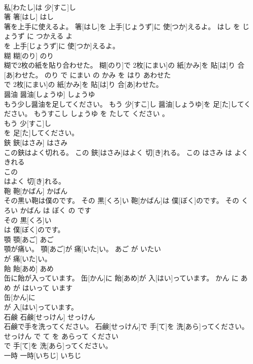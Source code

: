 \documentclass[8pt]{extreport}
\begin{document}
\begin{CJK}{UTF8}{min}
\\	私[わたし]は 少[すこ]し
\\	箸	箸[はし]	はし	
\\	箸を上手に使えるよ。	箸[はし]を 上手[じょうず]に 使[つか]えるよ。	はし を じょうず に つかえる よ	
\\	を 上手[じょうず]に 使[つか]えるよ。			
\\	糊	糊[のり]	のり	
\\	糊で2枚の紙を貼り合わせた。	糊[のり]で 2枚[にまい]の 紙[かみ]を 貼[は]り 合[あ]わせた。	のり で にまい の かみ を はり あわせた	
\\	で 2枚[にまい]の 紙[かみ]を 貼[は]り 合[あ]わせた。			
\\	醤油	醤油[しょうゆ]	しょうゆ	
\\	もう少し醤油を足してください。	もう 少[すこ]し 醤油[しょうゆ]を 足[た]してください。	もうすこし しょうゆ を たして ください 。	
\\	もう 少[すこ]し
\\	を 足[た]してください。			
\\	鋏	鋏[はさみ]	はさみ	
\\	この鋏はよく切れる。	この 鋏[はさみ]はよく 切[き]れる。	この はさみ は よく きれる	
\\	この
\\	はよく 切[き]れる。			
\\	鞄	鞄[かばん]	かばん	
\\	その黒い鞄は僕のです。	その 黒[くろ]い 鞄[かばん]は 僕[ぼく]のです。	その くろい かばん は ぼく の です	
\\	その 黒[くろ]い
\\	は 僕[ぼく]のです。			
\\	顎	顎[あご]	あご	
\\	顎が痛い。	顎[あご]が 痛[いた]い。	あご が いたい	
\\	が 痛[いた]い。			
\\	飴	飴[あめ]	あめ	
\\	缶に飴が入っています。	缶[かん]に 飴[あめ]が 入[はい]っています。	かん に あめ が はいって います	
\\	缶[かん]に
\\	が 入[はい]っています。			
\\	石鹸	石鹸[せっけん]	せっけん	
\\	石鹸で手を洗ってください。	石鹸[せっけん]で 手[て]を 洗[あら]ってください。	せっけん で て を あらって ください	
\\	で 手[て]を 洗[あら]ってください。			
\\	一時	一時[いちじ]	いちじ	

\end{CJK}
\end{document}
